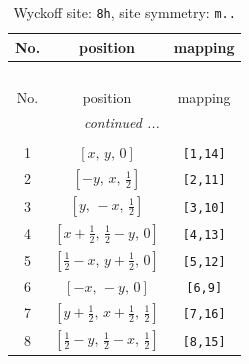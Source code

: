 \documentclass[fleqn,8pt]{jsarticle}
\begin{document}
\begin{longtable}{ccc}
\caption{Wyckoff site: {\tt 8h}, site symmetry: {\tt m..}}
 \\
 \hline \hline
No. & position & mapping \\ \hline \endfirsthead

\multicolumn{2}{l}{\tablename\ \thetable{}} \\
 \hline \hline
No. & position & mapping \\ \hline \endhead

 \hline \hline
\multicolumn{2}{r}{\footnotesize\it continued ...} \\ \endfoot

 \hline \hline
\multicolumn{2}{r}{} \\ \endlastfoot

1 & $\left[ x,\, y,\, 0 \right]$ & {\tt [1,14]} \\ \hline
2 & $\left[ - y,\, x,\, \frac{1}{2} \right]$ & {\tt [2,11]} \\ \hline
3 & $\left[ y,\, - x,\, \frac{1}{2} \right]$ & {\tt [3,10]} \\ \hline
4 & $\left[ x + \frac{1}{2},\, \frac{1}{2} - y,\, 0 \right]$ & {\tt [4,13]} \\ \hline
5 & $\left[ \frac{1}{2} - x,\, y + \frac{1}{2},\, 0 \right]$ & {\tt [5,12]} \\ \hline
6 & $\left[ - x,\, - y,\, 0 \right]$ & {\tt [6,9]} \\ \hline
7 & $\left[ y + \frac{1}{2},\, x + \frac{1}{2},\, \frac{1}{2} \right]$ & {\tt [7,16]} \\ \hline
8 & $\left[ \frac{1}{2} - y,\, \frac{1}{2} - x,\, \frac{1}{2} \right]$ & {\tt [8,15]} \\
\end{longtable}
\renewcommand{\arraystretch}{1.2}
\end{document}
